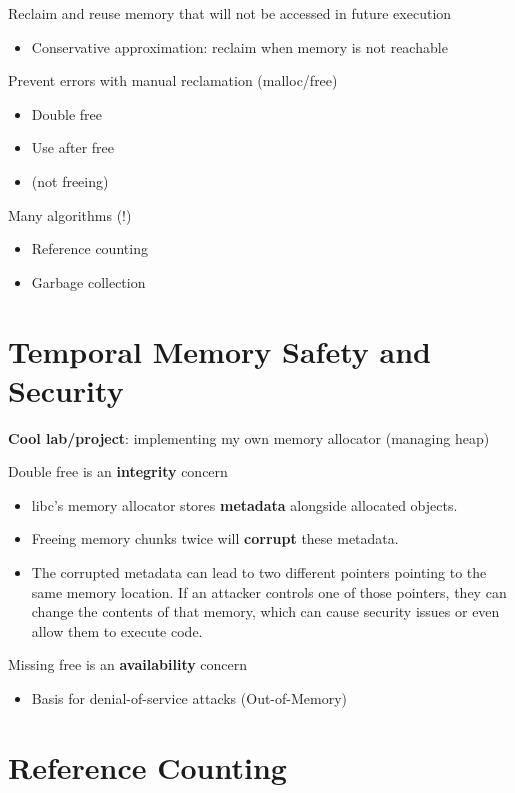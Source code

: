 \documentclass[11pt]{article}
\begin{document}
Reclaim and reuse memory that will not be accessed in future execution
\begin{itemize}
	\item Conservative approximation: reclaim when memory is not reachable
\end{itemize}

Prevent errors with manual reclamation (malloc/free)

\begin{itemize}
	\item Double free
	\item Use after free
	\item (not freeing)
\end{itemize}

Many algorithms (!)
\begin{itemize}
	\item Reference counting
	\item Garbage collection
\end{itemize}

\section*{Temporal Memory Safety and Security}

\textbf{Cool lab/project}: implementing my own memory allocator (managing heap) 

Double free is an \textbf{integrity} concern
\begin{itemize}
	\item libc's memory allocator stores \textbf{metadata} alongside allocated objects.
	\item Freeing memory chunks twice will \textbf{corrupt} these metadata.
	\item The corrupted metadata can lead to two different pointers pointing to the same memory location. If an attacker controls one of those pointers, they can change the contents of that memory, which can cause security issues or even allow them to execute code.
\end{itemize}
Missing free is an \textbf{availability} concern
\begin{itemize}
	\item Basis for denial-of-service attacks (Out-of-Memory)
\end{itemize}

\section*{Reference Counting}
\end{document}
